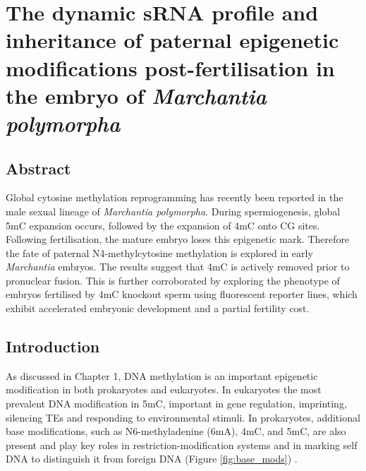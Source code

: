 \chapter{The dynamic sRNA profile and inheritance of paternal epigenetic modifications post-fertilisation in the embryo of \textit{Marchantia polymorpha}}

\ifpdf
    \graphicspath{{Chapter3/Figs/Raster/}{Chapter3/Figs/PDF/}{Chapter3/Figs/}}
\else
    \graphicspath{{Chapter3/Figs/Vector/}{Chapter3/Figs/}}
\fi


\section{Abstract}

Global cytosine methylation reprogramming has recently been reported in the male sexual lineage of \textit{Marchantia polymorpha}. During spermiogenesis, global 5mC expansion occurs, followed by the expansion of 4mC onto CG sites. Following fertilisation, the mature embryo loses this epigenetic mark. Therefore the fate of paternal N4-methylcytosine methylation is explored in early \textit{Marchantia} embryos. The results suggest that 4mC is actively removed prior to pronuclear fusion. This is further corroborated by exploring the phenotype of embryos fertilised by 4mC knockout sperm using fluorescent reporter lines, which exhibit accelerated embryonic development and a partial fertility cost.


\section{Introduction}

As discussed in Chapter 1, DNA methylation is an important epigenetic modification in both prokaryotes and eukaryotes. In eukaryotes the most prevalent DNA modification in 5mC, important in gene regulation, imprinting, silencing TEs and responding to environmental stimuli. In prokaryotes, additional base modifications, such as N6-methyladenine (6mA), 4mC, and 5mC, are also present and play key roles in restriction-modification systems and in marking self DNA to distinguish it from foreign DNA (Figure \ref{fig:base_mods}) \citep{RN309}.

